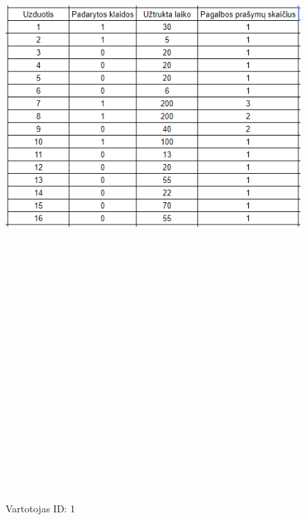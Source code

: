 \documentclass[oneside]{VUMIFPSkursinis}
\begin{document}
	\begin{figure}[h]
			\centering
			\includegraphics[width=15cm,height=60cm,keepaspectratio]{1.png}
			\caption{ Vartotojas ID: 1}
	\end{figure}
\end{document}
